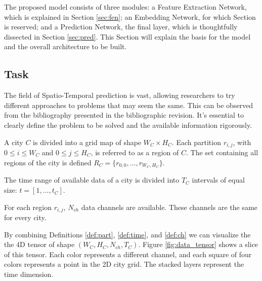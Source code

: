 The proposed model consists of three modules: a Feature Extraction Network, which is explained in Section \ref{sec:fen}; an Embedding Network, for which Section \label{sec:emb} is reserved; and a Prediction Network, the final layer, which is thoughtfully dissected in Section \ref{sec:pred}. This Section will explain the basis for the model and the overall architecture to be built.

\subsection{Task}
The field of Spatio-Temporal prediction is vast, allowing researchers to try different approaches to problems that may seem the same. This can be observed from the bibliography presented in the bibliographic revision. It's essential to clearly define the problem to be solved and the available information rigorously.

\begin{definition}\label{def:part}
A city $C$ is divided into a grid map of shape $W_{C}\times H_{C}$. Each partition $r_{i, j}$, with $0\leq i \leq W_C$ and $0\leq j \leq H_C$, is referred to as a region of $C$. The set containing all regions of the city is defined $R_C=\{r_{0, 0}, ..., r_{W_C, H_C}\}$.
\end{definition}



\begin{definition}\label{def:time}
The time range of available data of a city is divided into $T_{C}$  intervals of equal size: $t=[1, ..., t_{C}]$.
\end{definition}


\begin{definition}\label{def:ch}
For each region $r_{i, j}$, $N_{ch}$ data channels are available. These channels are the same for every city.
\end{definition}

By combining Definitions \ref{def:part}, \ref{def:time}, and \ref{def:ch} we can visualize the the 4D tensor of shape $(W_C, H_C, N_{ch}, T_C)$. Figure \ref{fig:data_tensor} shows a slice of this tensor. Each color represents a different channel, and each square of four colors represents a point in the 2D city grid. The stacked layers represent the time dimension.

